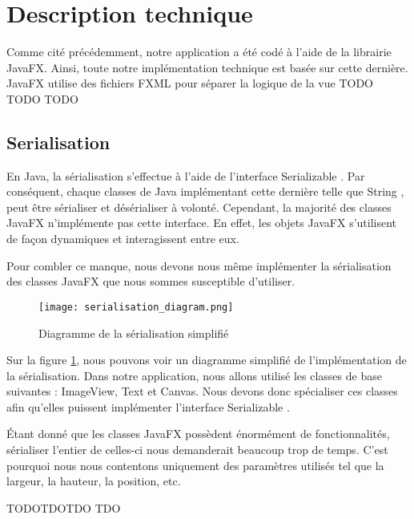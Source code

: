 \section{Description technique}

Comme cité précédemment, notre application a été codé à l'aide de la librairie JavaFX. Ainsi, toute notre implémentation technique est basée sur cette dernière. JavaFX utilise des fichiers FXML pour séparer la logique de la vue TODO TODO TODO

\subsection{Serialisation}
En Java, la sérialisation s'effectue à l'aide de l'interface \og Serializable \fg{}. Par conséquent, chaque classes de Java implémentant cette dernière telle que \og String \fg{}, peut être sérialiser et désérialiser à volonté. Cependant, la majorité des classes JavaFX n'implémente pas cette interface. En effet, les objets JavaFX s'utilisent de façon dynamiques et interagissent entre eux. 

Pour combler ce manque, nous devons nous même implémenter la sérialisation des classes JavaFX que nous sommes susceptible d'utiliser.

\begin{figure}[h]
    \caption{Diagramme de la sérialisation simplifié}
    \centering
    \texttt{[image: serialisation\_diagram.png]}
    \label{fig:seri_diag}
\end{figure}

Sur la figure \ref{fig:seri_diag}, nous pouvons voir un diagramme simplifié de l'implémentation de la sérialisation. Dans notre application, nous allons utilisé les classes de base suivantes : ImageView, Text et Canvas. Nous devons donc spécialiser ces classes afin qu'elles puissent implémenter l'interface \og Serializable \fg{}. 

Étant donné que les classes JavaFX possèdent énormément de fonctionnalités, sérialiser l'entier de celles-ci nous demanderait beaucoup trop de temps. C'est pourquoi nous nous contentons uniquement des paramètres utilisés tel que la largeur, la hauteur, la position, etc. 

TODOTDOTDO TDO





